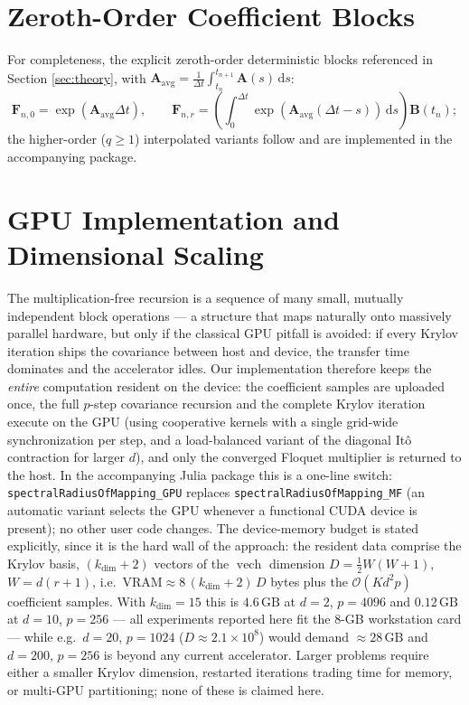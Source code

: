 \documentclass[preprint,12pt]{elsarticle}
\begin{document}
\section{Zeroth-Order Coefficient Blocks}
\label{app:blocks}
For completeness, the explicit zeroth-order deterministic blocks referenced in Section \ref{sec:theory}, with $\mathbf{A}_{\mathrm{avg}} = \frac{1}{\Delta t}\int_{t_n}^{t_{n+1}}\mathbf{A}(s)\,\mathrm{d}s$:
\begin{equation}
\mathbf{F}_{n,0} = \exp(\mathbf{A}_{\mathrm{avg}} \Delta t), \qquad
\mathbf{F}_{n,r} = \left(\int_0^{\Delta t} \exp(\mathbf{A}_{\mathrm{avg}}(\Delta t - s))\, \mathrm{d}s\right) \mathbf{B}(t_n);
\end{equation}
the higher-order ($q \ge 1$) interpolated variants follow \cite{Insperger2011, Sykora2019} and are implemented in the accompanying package.

\section{GPU Implementation and Dimensional Scaling}
\label{app:gpu}

The multiplication-free recursion is a sequence of many small, mutually independent block operations --- a structure that maps naturally onto massively parallel hardware, but only if the classical GPU pitfall is avoided: if every Krylov iteration ships the covariance between host and device, the transfer time dominates and the accelerator idles. Our implementation therefore keeps the \emph{entire} computation resident on the device: the coefficient samples are uploaded once, the full $p$-step covariance recursion and the complete Krylov iteration execute on the GPU (using cooperative kernels with a single grid-wide synchronization per step, and a load-balanced variant of the diagonal It\^o contraction for larger $d$), and only the converged Floquet multiplier is returned to the host. In the accompanying Julia package this is a one-line switch: \texttt{spectralRadiusOfMapping\_GPU} replaces \texttt{spectralRadiusOfMapping\_MF} (an automatic variant selects the GPU whenever a functional CUDA device is present); no other user code changes. The device-memory budget is stated explicitly, since it is the hard wall of the approach: the resident data comprise the Krylov basis, $(k_{\mathrm{dim}}{+}2)$ vectors of the $\operatorname{vech}$ dimension $D = \tfrac12 W(W{+}1)$, $W = d(r{+}1)$, i.e.\ $\mathrm{VRAM} \approx 8\,(k_{\mathrm{dim}}{+}2)\,D$ bytes plus the $\mathcal{O}(K d^2 p)$ coefficient samples. With $k_{\mathrm{dim}} = 15$ this is $4.6\,\mathrm{GB}$ at $d=2$, $p=4096$ and $0.12\,\mathrm{GB}$ at $d=10$, $p=256$ --- all experiments reported here fit the 8-GB workstation card --- while e.g.\ $d = 20$, $p = 1024$ ($D \approx 2.1\times10^8$) would demand $\approx 28\,\mathrm{GB}$ and $d=200$, $p=256$ is beyond any current accelerator. Larger problems require either a smaller Krylov dimension, restarted iterations trading time for memory, or multi-GPU partitioning; none of these is claimed here.
\end{document}
